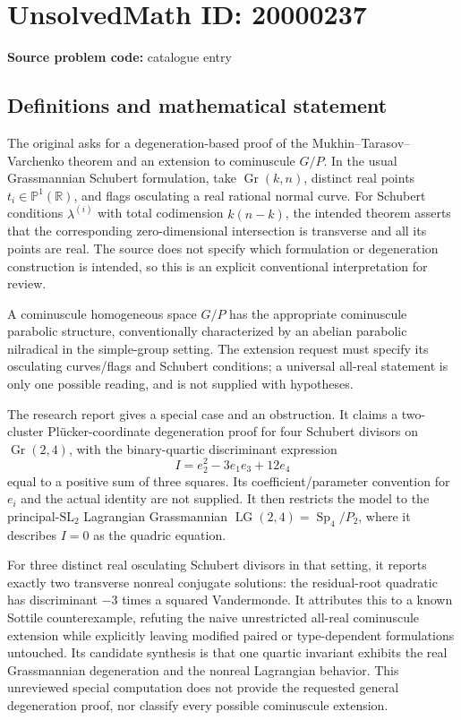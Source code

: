 \documentclass[11pt]{article}
\newcommand{\R}{\mathbb{R}}
\newcommand{\PP}{\mathbb{P}}
\begin{document}
\section*{UnsolvedMath ID: 20000237}
\textbf{Source problem code:} catalogue entry
\subsection{Definitions and mathematical statement}
The original asks for a degeneration-based proof of the Mukhin--Tarasov--Varchenko theorem and an extension to cominuscule $G/P$. In the usual Grassmannian Schubert formulation, take $\operatorname{Gr}(k,n)$, distinct real points $t_i\in\PP^1(\R)$, and flags osculating a real rational normal curve. For Schubert conditions $\lambda^{(i)}$ with total codimension $k(n-k)$, the intended theorem asserts that the corresponding zero-dimensional intersection is transverse and all its points are real. The source does not specify which formulation or degeneration construction is intended, so this is an explicit conventional interpretation for review.

A cominuscule homogeneous space $G/P$ has the appropriate cominuscule parabolic structure, conventionally characterized by an abelian parabolic nilradical in the simple-group setting. The extension request must specify its osculating curves/flags and Schubert conditions; a universal all-real statement is only one possible reading, and is not supplied with hypotheses.

The research report gives a special case and an obstruction. It claims a two-cluster Pl\"ucker-coordinate degeneration proof for four Schubert divisors on $\operatorname{Gr}(2,4)$, with the binary-quartic discriminant expression
\[
 I=e_2^2-3e_1e_3+12e_4
\]
equal to a positive sum of three squares. Its coefficient/parameter convention for $e_i$ and the actual identity are not supplied. It then restricts the model to the principal-$\mathrm{SL}_2$ Lagrangian Grassmannian $\operatorname{LG}(2,4)=\operatorname{Sp}_4/P_2$, where it describes $I=0$ as the quadric equation.

For three distinct real osculating Schubert divisors in that setting, it reports exactly two transverse nonreal conjugate solutions: the residual-root quadratic has discriminant $-3$ times a squared Vandermonde. It attributes this to a known Sottile counterexample, refuting the naive unrestricted all-real cominuscule extension while explicitly leaving modified paired or type-dependent formulations untouched. Its candidate synthesis is that one quartic invariant exhibits the real Grassmannian degeneration and the nonreal Lagrangian behavior. This unreviewed special computation does not provide the requested general degeneration proof, nor classify every possible cominuscule extension.
\end{document}
